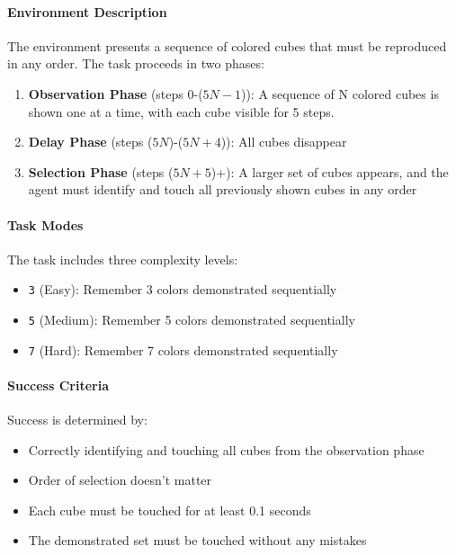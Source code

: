 \paragraph{Environment Description} The environment presents a sequence of colored cubes that must be reproduced in any order. The task proceeds in two phases:
\begin{enumerate}
    \item \textbf{Observation Phase} (steps 0-($5N-1$)): A sequence of N colored cubes is shown one at a time, with each cube visible for 5 steps.
    \item \textbf{Delay Phase} (steps ($5N$)-($5N+4$)): All cubes disappear
    \item \textbf{Selection Phase} (steps ($5N+5$)+): A larger set of cubes appears, and the agent must identify and touch all previously shown cubes in any order
\end{enumerate}

\paragraph{Task Modes} The task includes three complexity levels:
\begin{itemize}
    \item \texttt{3} (Easy): Remember 3 colors demonstrated sequentially
    \item \texttt{5} (Medium): Remember 5 colors demonstrated sequentially
    \item \texttt{7} (Hard): Remember 7 colors demonstrated sequentially
\end{itemize}

\paragraph{Success Criteria} Success is determined by:
\begin{itemize}
    \item Correctly identifying and touching all cubes from the observation phase
    \item Order of selection doesn't matter
    \item Each cube must be touched for at least 0.1 seconds
    \item The demonstrated set must be touched without any mistakes
\end{itemize}

